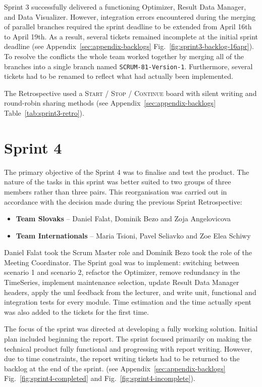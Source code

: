 Sprint 3 successfully delivered a functioning Optimizer, Result Data Manager, and Data Visualizer. However, integration errors encountered during the merging of parallel branches required the sprint deadline to be extended from April 16th to April 19th. As a result, several tickets remained incomplete at the initial sprint deadline (see Appendix~\ref{sec:appendix-backlogs} Fig.~\ref{fig:sprint3-backlog-16apr}). To resolve the conflicts the whole team worked together by merging all of the branches into a single branch named \texttt{SCRUM-81-Version-1}. Furthermore, several tickets had to be renamed to reflect what had actually been implemented.

The Retrospective used a \textsc{Start} / \textsc{Stop} / \textsc{Continue} board with silent writing and round-robin sharing methods (see Appendix~\ref{sec:appendix-backlogs} Table~\ref{tab:sprint3-retro}).

\section{Sprint 4}
\label{sec:sprint4}

The primary objective of the Sprint 4 was to finalise and test the product. The nature of the tasks in this sprint was better suited to two groups of three members rather than three pairs. This reorganisation was carried out in accordance with the decision made during the previous Sprint Retrospective:
\begin{itemize}
    \item \textbf{Team Slovaks} -- Daniel Falat, Dominik Bezo and Zoja Angelovicova
    \item \textbf{Team Internationals} -- Maria Tsioni, Pavel Seliavko and Zoe Elea Schiwy
\end{itemize}

Daniel Falat took the Scrum Master role and Dominik Bezo took the role of the Meeting Coordinator. The Sprint goal was to implement: switching between scenario 1 and scenario 2, refactor the Optimizer, remove redundancy in the TimeSeries, implement maintenance selection, update Result Data Manager headers, apply the \acrshort{uml} feedback from the lecturer, and write unit, functional and integration tests for every module. Time estimation and the time actually spent was also added to the tickets for the first time.

The focus of the sprint was directed at developing a fully working solution. Initial plan included beginning the report. The sprint focused primarily on making the technical product fully functional and progressing with report writing. However, due to time constraints, the report writing tickets had to be returned to the backlog at the end of the sprint. (see Appendix~\ref{sec:appendix-backlogs} Fig.~\ref{fig:sprint4-completed} and Fig.~\ref{fig:sprint4-incomplete}).

